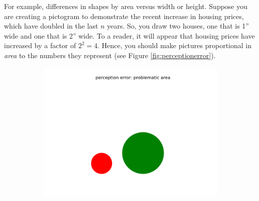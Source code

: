 For example, differences in shapes by area versus width or height.
Suppose you are creating a pictogram to demonstrate the recent increase in housing prices, which have doubled in the last $n$ years. 
So, you draw two houses, one that is 1'' wide and one that is 2'' wide. 
To a reader, it will appear that housing prices have increased by a factor of $2^2=4$. 
Hence, you should make pictures proportional in \emph{area} to the numbers they represent (see Figure \ref{fig:perceptionerror}). 

\begin{figure}[h]
\centering
\begin{subfigure}{.4\textwidth}
\centering
\includegraphics[width=\textwidth]{PE_problematic_area.png}
\end{subfigure}
\begin{subfigure}{.4\textwidth}
\centering

\end{subfigure}
\end{figure}
